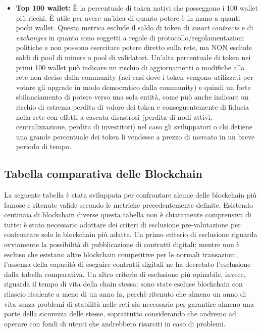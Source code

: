 \documentclass[a4paper, 12pt]{article}
\begin{document}
\begin{itemize}
\item \textbf{Top 100 wallet: }
È la percentuale di token nativi che posseggono i 100 wallet più ricchi.
È utile per avere un'idea di quanto potere è in mano a quanti pochi wallet.
Questa metrica esclude il saldo di token di \textit{smart contracts} e di \textit{exchanges} in quanto sono soggetti a regole di protocollo/regolamentazioni politiche e
non possono esercitare potere diretto sulla rete, ma NON esclude saldi di pool di miners o pool di validatori.
Un'alta percentuale di token nei primi 100 wallet può indicare un rischio di aggiornamenti o modifiche alla rete non decise dalla community (nei casi dove i token
vengono utilizzati per votare gli upgrade in modo democratico dalla community) e quindi un forte sbilanciamento di potere verso una sola entità, come può anche indicare un rischio
di estrema perdita di valore dei token e conseguentemente di fiducia nella rete con effetti a cascata disastrosi (perdita di nodi attivi, centralizzazione, perdita di investitori) nel caso gli sviluppatori o chi detiene una grande percentuale dei token li vendesse a prezzo di mercato in un breve periodo di tempo.

\end{itemize}

\newpage

\subsection*{Tabella comparativa delle Blockchain}
La seguente tabella è stata sviluppata per confrontare alcune delle blockchain più famose e ritenute valide secondo le metriche precedentemente definite.
Esistendo centinaia di blockchain diverse questa tabella non è chiaramente comprensiva di tutte: è stato necessario adottare dei criteri di esclusione pre-valutazione per confrontare
solo le blockchain più adatte.
Un primo criterio di esclusione riguarda ovviamente la possibilità di pubblicazione di contratti digitali: mentre non è escluso che esistano altre blockchain competitive
per le normali transazioni, l'assenza della capacità di eseguire contratti digitali ne ha decretato l'esclusione dalla tabella comparativa.
Un altro criterio di esclusione più opinabile, invece, riguarda il tempo di vita della chain stessa: sono state escluse blockchain con rilascio risalente a meno di un anno fa,
perchè ritenuto che almeno un anno di vita senza problemi di stabilità nelle reti sia necessario per garantire almeno una parte della sicurezza delle stesse, soprattutto
considerando che andremo ad operare con fondi di utenti che andrebbero risarciti in caso di problemi.
\end{document}
